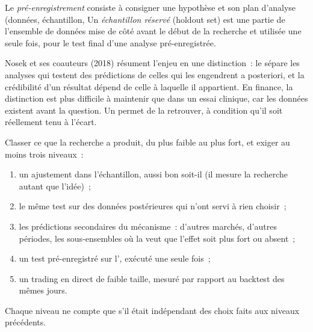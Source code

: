 \begin{definition}\label{def:rs:the-research-process:prereg}
Le \emph{pré-enregistrement} consiste à consigner une hypothèse et son plan d'analyse (données, échantillon,
Un \emph{échantillon réservé} (holdout set) est une partie de
l'ensemble de données mise de côté avant le début de la recherche et utilisée une seule fois, pour le test final d'une analyse pré-enregistrée.
\end{definition}

Nosek et ses coauteurs (2018) résument l'enjeu en une distinction~: le  sépare les analyses qui testent des prédictions de celles
qui les engendrent a posteriori, et la crédibilité d'un résultat dépend de celle à laquelle il appartient. En finance, la distinction est plus
difficile à maintenir que dans un essai clinique, car les données existent avant la question. Un  permet de la retrouver,
à condition qu'il soit réellement tenu à l'écart.

\begin{method}\label{met:rs:the-research-process:evidence}
Classer ce que la recherche a produit, du plus faible au plus fort, et exiger au moins trois niveaux~:
\begin{enumerate}
\item un ajustement dans l'échantillon, aussi bon soit-il (il mesure la recherche autant que l'idée)~;
\item le même test sur des données postérieures qui n'ont servi à rien choisir~;
\item les prédictions secondaires du mécanisme~: d'autres marchés, d'autres périodes, les sous-ensembles où la  veut que
l'effet soit plus fort ou absent~;
\item un test pré-enregistré sur l', exécuté une seule fois~;
\item un trading en direct de faible taille, mesuré par rapport au backtest des mêmes jours.
\end{enumerate}
Chaque niveau ne compte que s'il était indépendant des choix faits aux niveaux précédents.
\end{method}

